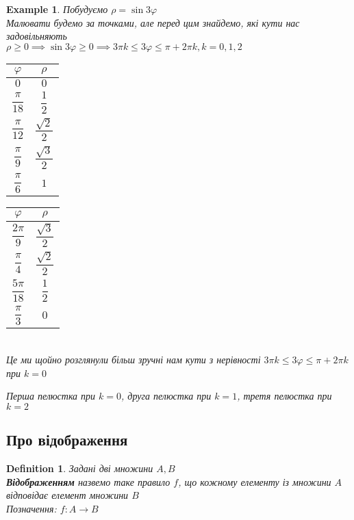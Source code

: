 \documentclass[a4paper, 14pt]{extarticle}
\theoremstyle{theoremdd}
\theoremstyle{theoremdd}
\newtheorem{definition}[theorem]{Definition}
\theoremstyle{theoremdd}
\theoremstyle{theoremdd}
\newtheorem{example}[theorem]{Example}
\theoremstyle{theoremdd}
\theoremstyle{theoremdd}
\theoremstyle{theoremdd}
\theoremstyle{theoremdd}
\begin{document}
\begin{example}
Побудуємо $\rho = \sin 3 \varphi$\\
Малювати будемо за точками, але перед цим знайдемо, які кути нас задовільняють\\
$\rho \geq 0 \implies \sin 3 \varphi \geq 0 \implies 3\pi k \leq 3 \varphi \leq \pi + 2 \pi k, k=0,1,2$
\begin{center}
\begin{tabular}{c|c}
$\varphi$ & $\rho$ \\
\hline
$0$ & $0$ \\
$\dfrac{\pi}{18}$ & $\dfrac{1}{2}$ \\
$\dfrac{\pi}{12}$ & $\dfrac{\sqrt{2}}{2}$ \\
$\dfrac{\pi}{9}$ & $\dfrac{\sqrt{3}}{2}$ \\
$\dfrac{\pi}{6}$ & $1$ \\
\end{tabular}
\qquad
\begin{tabular}{c|c}
$\varphi$ & $\rho$ \\
\hline
$\dfrac{2 \pi}{9}$ & $\dfrac{\sqrt{3}}{2}$ \\
$\dfrac{\pi}{4}$ & $\dfrac{\sqrt{2}}{2}$ \\
$\dfrac{5 \pi}{18}$ &  $\dfrac{1}{2}$ \\
$\dfrac{\pi}{3}$ & $0$ \\
\end{tabular} \\
Це ми щойно розглянули більш зручні нам кути з нерівності $3 \pi k \leq 3 \varphi \leq \pi + 2 \pi k$ при $k = 0$
\end{center}

\begin{center}
\end{center}
Перша пелюстка при $k = 0$, друга пелюстка при $k =1$, третя пелюстка при $k = 2$
\end{example}

\subsection{Про відображення}
\begin{definition}
Задані дві множини $A,B$\\
\textbf{Відображенням} назвемо таке правило $f$, що кожному елементу із множини $A$ відповідає елемент множини $B$\\
Позначення: $f: A \to B$
\end{definition}
\end{document}
